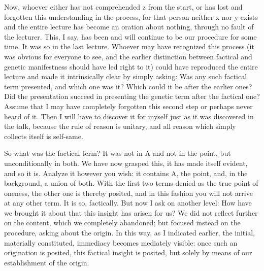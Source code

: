 Now, whoever either has not comprehended z from the start,
or has lost and forgotten this understanding in the process,
for that person neither x nor y exists and
the entire lecture has become an oration about nothing,
through no fault of the lecturer.
This, I say, has been and will continue to be
our procedure for some time.
It was so in the last lecture.
Whoever may have recognized this process
(it was obvious for everyone to see,
and the earlier distinction between
factical and genetic manifestness
should have led right to it)
could have reproduced the entire lecture
and made it intrinsically clear by simply asking:
Was any such factical term presented,
and which one was it?
Which could it be after the earlier ones?
Did the presentation succeed in
presenting the genetic term after the factical one?
Assume that I may have completely forgotten
this second step or perhaps never heard of it.
Then I will have to discover it for myself
just as it was discovered in the talk,
because the rule of reason is unitary, and
all reason which simply collects itself is self-same.

So what was the factical term?
It was not in A and not in the point,
but unconditionally in both.
We have now grasped this,
it has made itself evident,
and so it is.
Analyze it however you wish:
it contains A, the point, and,
in the background, a union of both.
With the first two terms denied as
the true point of oneness,
the other one is thereby posited,
and in this fashion you will not
arrive at any other term.
It is so, factically.
But now I ask on another level:
How have we brought it about that
this insight has arisen for us?
We did not reflect further on the content,
which we completely abandoned;
but focused instead on the procedure,
asking about the origin.
In this way, as I indicated earlier,
the initial, materially constituted,
immediacy becomes mediately visible:
once such an origination is posited,
this factical insight is posited,
but solely by means of
our establishment of the origin.

